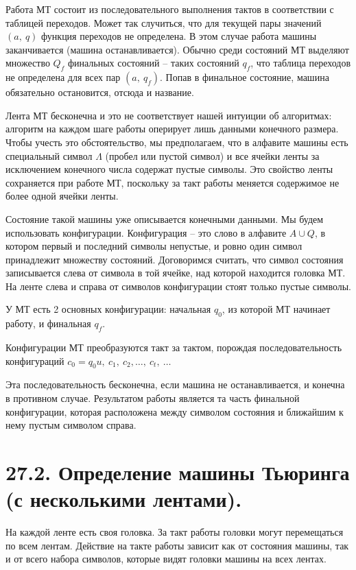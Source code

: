 Работа МТ состоит из последовательного выполнения тактов в соответствии с таблицей переходов. Может так случиться, что для текущей пары значений $(a,\ q)$ функция переходов не определена. В этом случае работа машины заканчивается (машина останавливается). Обычно среди состояний МТ выделяют множество $Q_f$ финальных состояний -- таких состояний $q_f$, что таблица переходов не определена для всех пар $(a,\ q_f)$. Попав в финальное состояние, машина обязательно остановится, отсюда и название. 

Лента МТ бесконечна и это не соответствует нашей интуиции об алгоритмах: алгоритм на каждом шаге работы оперирует лишь данными конечного размера. Чтобы учесть это обстоятельство, мы предполагаем, что в алфавите машины есть специальный символ $\Lambda$ (пробел или пустой символ) и все ячейки ленты за исключением конечного числа содержат пустые символы. Это свойство ленты сохраняется при работе МТ, поскольку за такт работы меняется содержимое не более одной ячейки ленты.

Состояние такой машины уже описывается конечными данными. Мы будем использовать конфигурации. Конфигурация -- это слово в алфавите $A \cup Q$, в котором первый и последний символы непустые, и ровно один символ принадлежит множеству состояний. Договоримся считать, что символ состояния записывается слева от символа в той ячейке, над которой находится головка МТ. На ленте слева и справа от символов конфигурации стоят только пустые
символы.

У МТ есть 2 основных конфигурации: начальная $q_0$, из которой МТ начинает работу, и финальная $q_f$.

Конфигурации МТ преобразуются такт за тактом, порождая последовательность конфигураций $c_0 = q_0u,\ c_1,\ c_2, \ldots ,\ c_t,\ \ldots$

Эта последовательность бесконечна, если машина не останавливается, и конечна в
противном случае. Результатом работы является та часть финальной конфигурации, которая расположена между символом состояния и ближайшим к нему пустым символом справа.

\section*{27.2. Определение машины Тьюринга (с несколькими лентами).}


На каждой ленте есть своя головка. За такт работы головки могут перемещаться по всем лентам. Действие на такте работы зависит как от состояния машины, так и от всего набора символов, которые
видят головки машины на всех лентах.

